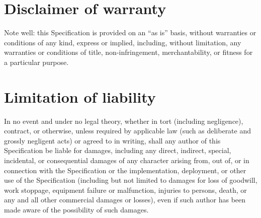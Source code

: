 \documentclass{uavcandoc}
\begin{document}
\begin{titlepage}
\section*{Disclaimer of warranty}

Note well: this Specification is provided on an ``as is'' basis, without warranties or conditions of any kind,
express or implied, including, without limitation, any warranties or conditions of
title, non-infringement, merchantability, or fitness for a particular purpose.

\section*{Limitation of liability}

In no event and under no legal theory, whether in tort (including negligence), contract, or otherwise,
unless required by applicable law (such as deliberate and grossly negligent acts) or agreed to in writing,
shall any author of this Specification be liable for damages,
including any direct, indirect, special, incidental, or consequential damages of any character arising
from, out of, or in connection with the Specification or the implementation, deployment,
or other use of the Specification (including but not limited to damages for loss of goodwill,
work stoppage, equipment failure or malfunction, injuries to persons, death,
or any and all other commercial damages or losses),
even if such author has been made aware of the possibility of such damages.

\end{titlepage}

\tableofcontents
\BeginRightColumn
\listoftables
\listoffigures

\mainmatter





\end{document}

